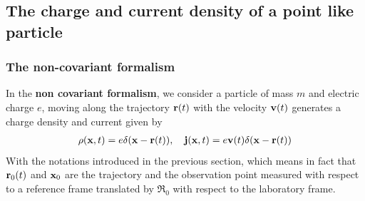 \subsection{The charge and current density of a point like particle}
\subsubsection{The non-covariant formalism}
In the {\bf non covariant formalism}, we consider a particle of mass $m$ and electric charge $e$, moving along the trajectory ${\bf r}(t)$ with the velocity ${\bf v}(t)$ generates a charge density and current given by
\begin{align}
    \rho({\bf x},t)=e\delta({\bf x}-{\bf r}(t)),\quad {\bf j}({\bf x},t)=e{\bf v}(t)\delta({\bf x}-{\bf r}(t))\label{def-J-NR}
\end{align}
With the notations introduced in the previous section, which means in fact that ${\bf r}_0(t)$ and ${\bf x}_0$ are  the trajectory and the observation point measured with respect to a reference frame translated by ${\boldsymbol{\mathfrak R}}_0$ with respect to the laboratory frame.

